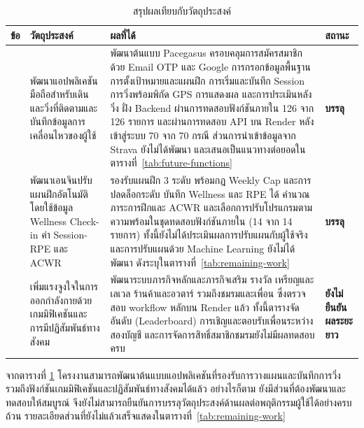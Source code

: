 \begin{table}[H]
\centering
\caption{สรุปผลเทียบกับวัตถุประสงค์}
\label{tab:obj_result}
\small
\begingroup
\setlength{\tabcolsep}{3pt}
\begin{tabular}{|>{\centering\arraybackslash}p{}|>{\raggedright\arraybackslash}p{}|>{\raggedright\arraybackslash}p{}|>{\centering\arraybackslash}p{}|}
\hline
\textbf{ข้อ} & \textbf{วัตถุประสงค์} & \textbf{ผลที่ได้} & \textbf{สถานะ} \\
\hline
1 & พัฒนาแอปพลิเคชันมือถือสำหรับเดินและวิ่งที่ติดตามและบันทึกข้อมูลการเคลื่อนไหวของผู้ใช้ & พัฒนาต้นแบบ Pacegasus ครอบคลุมการสมัครสมาชิกด้วย Email OTP และ Google การกรอกข้อมูลพื้นฐาน การตั้งเป้าหมายและแผนฝึก การเริ่มและบันทึก Session การวิ่งพร้อมพิกัด GPS การแสดงผล และการประเมินหลังวิ่ง ฝั่ง Backend ผ่านการทดสอบฟังก์ชันภายใน 126 จาก 126 รายการ และผ่านการทดสอบ API บน Render หลังเข้าสู่ระบบ 70 จาก 70 กรณี ส่วนการนำเข้าข้อมูลจาก Strava ยังไม่ได้พัฒนา และเสนอเป็นแนวทางต่อยอดในตารางที่~\ref{tab:future-functions} & \textbf{บรรลุ} \\ \hline
2 & พัฒนาเอนจินปรับแผนฝึกอัตโนมัติโดยใช้ข้อมูล Wellness Check-in ค่า Session-RPE และ ACWR & รองรับแผนฝึก 3 ระดับ พร้อมกฎ Weekly Cap และการปลดล็อกระดับ บันทึก Wellness และ RPE ได้ คำนวณภาระการฝึกและ ACWR และเลือกการปรับโปรแกรมตามความพร้อมในชุดทดสอบฟังก์ชันภายใน (14 จาก 14 รายการ) ทั้งนี้ยังไม่ได้ประเมินผลการปรับแผนกับผู้ใช้จริง และการปรับแผนด้วย Machine Learning ยังไม่ได้พัฒนา ดังระบุในตารางที่~\ref{tab:remaining-work} & \textbf{บรรลุ} \\ \hline
3 & เพิ่มแรงจูงใจในการออกกำลังกายด้วยเกมมิฟิเคชันและการมีปฏิสัมพันธ์ทางสังคม & พัฒนาระบบภารกิจหลักและภารกิจเสริม รางวัล เหรียญและเลเวล ร้านค้าและอวตาร์ รวมถึงชมรมและเพื่อน ซึ่งตรวจสอบ workflow หลักบน Render แล้ว ทั้งนี้ตารางจัดอันดับ (Leaderboard) การเชิญและตอบรับเพื่อนระหว่างสองบัญชี และการจัดการสิทธิ์สมาชิกชมรมยังไม่มีผลทดสอบครบ & \textbf{ยังไม่ยืนยันผลระยะยาว} \\
\hline
\end{tabular}
\endgroup
\end{table}

จากตารางที่ \ref{tab:obj_result} โครงงานสามารถพัฒนาต้นแบบแอปพลิเคชันที่รองรับการวางแผนและบันทึกการวิ่ง รวมถึงฟังก์ชันเกมมิฟิเคชันและปฏิสัมพันธ์ทางสังคมได้แล้ว อย่างไรก็ตาม ยังมีส่วนที่ต้องพัฒนาและทดสอบให้สมบูรณ์ จึงยังไม่สามารถยืนยันการบรรลุวัตถุประสงค์ด้านผลต่อพฤติกรรมผู้ใช้ได้อย่างครบถ้วน รายละเอียดส่วนที่ยังไม่แล้วเสร็จแสดงในตารางที่~\ref{tab:remaining-work}

